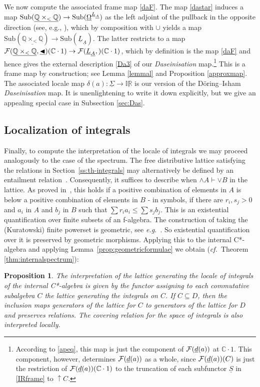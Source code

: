 \documentclass[12pt]{article}
\newcommand{\Q}{\mathbb{Q}}
\newcommand{\uIR}{\underline{\mathbb{IR}}}
\newcommand{\drie}{\vartriangleleft}
\newcommand{\coveredd}{\ensuremath{\mathop{\blacktriangleleft}}}
\newcommand{\raw}{\rightarrow} \newcommand{\rat}{\mapsto}
\newcommand{\x}{\times} \newcommand{\hb}{\hbar}
\newcommand{\er}{\eqref}
\newcommand{\dl}{\delta} \newcommand{\Dl}{\Delta}
\newcommand{\C}{{\mathbb C}} \newcommand{\D}{{\mathbb D}}
\newcommand{\functor}[1]{\ensuremath{\underline{#1}}}
\newcommand{\uA}{\underline{A}}
\newcommand{\eg}{\textit{e.g.}}
\newcommand{\ulS}{\functor{\Sigma}}
\newtheorem{proposition}[theorem]{Proposition}
\begin{document}
We now compute the associated frame map \er{daF}.
The map \er{dastar} induces a map $\mathrm{Sub}(\underline{\Q\x_{<}\Q})\raw\mathrm{Sub}(\underline{\Om}^{\underline{L}_{\uA}})$ as the left adjoint of the pullback in the opposite direction
 (see, e.g., \cite[Exercise I.10]{maclanemoerdijk92}), which by composition with $\cup$ yields a map  $\mathrm{Sub}(\underline{\Q\x_{<}\Q})\raw\mathrm{Sub}(\underline{L}_{\uA})$. The latter restricts to a map $ \CF(\underline{\Q\x_{<}\Q},\underline{\coveredd})(\C\cdot 1)\raw
  \CF(\underline{L}_{\uA},\underline{\drie})(\C\cdot 1)$, which by definition is the map \er{daF}
  and hence gives the external description \er{Da3} of our {\it Daseinisation} map.\footnote{According to \er{apeq}, this map
   is just the component of ${\mathcal F}(\underline{d}(a))$ at $\C\cdot 1$. This component, however, determines ${\mathcal F}(\underline{d}(a))$ as a whole, since ${\mathcal F}(\underline{d}(a))(C)$ is just the restriction
of  $\CF(\underline{d}(a))(\C\cdot 1)$ to  the truncation of each subfunctor $\underline{S}$ in \er{IRframe}  to $\uparrow\! C$.} This is a frame map by construction; see
Lemma \er{lemmal} and Proposition \er{approxmap}.  The associated 
 locale map $\dl(a):\ulS\raw\uIR$  is our version of the D\"{o}ring--Isham {\it Daseinisation} map. It is unenlightening to write it down explicitly, but we give an appealing special case in Subsection \ref{sec:Das}.
\subsection{Localization of integrals}
Finally, to compute the interpretation of the locale of integrals we
may proceed analogously to  the case of the spectrum.
 The free distributive lattice satisfying the relations in
Section~\ref{ss:th-integrals} may alternatively be defined by an entailment
relation~\cite{coquand:entail}. Consequently, it suffices to describe when
$\wedge A \vdash \vee B$ in the lattice. As proved
in~\cite{coquand05, Coquand/Spitters:integrals-valuations}, this holds if
a positive combination of elements in $A$ is below a positive combination of
elements in $B$ - in symbols, if there are $r_i,s_j>0$ and $a_i$ in
$A$ and $b_j$ in $B$ such that $\sum r_i a_i \leqslant \sum s_j b_j$. This
is an existential quantification over finite subsets of an
f-algebra. The construction of taking the (Kuratowski) finite
powerset is geometric, see \eg\ \cite{Vic:LocTopSp}. So existential
quantification over it is preserved by geometric morphisms. Applying this to the
internal C*-algebra and applying Lemma~\ref{prop:geometricformulae} we
obtain ({\it cf.}\ Theorem \ref{thm:internalspectrum}):
\begin{proposition}
  The interpretation of the lattice generating the locale of integrals
  of the internal C*-algebra is given by the functor assigning to
  each commutative subalgebra $C$ the lattice generating the integrals
  on $C$. If $C\subseteq D$, then the inclusion maps generators of the
  lattice for $C$ to generators of the lattice for $D$ and preserves
  relations. The covering relation for the space of integrals is also
  interpreted locally.
\end{proposition}
\end{document}
